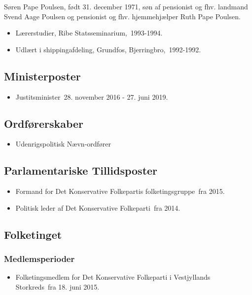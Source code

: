 \documentclass[11pt, a4paper]{awesome-cv}
\begin{document}
\makecvheader[R]
\makelettertitle
\begin{cvletter}
Søren Pape Poulsen, født 31. december 1971, søn af pensionist og fhv. landmand Svend Aage Poulsen og pensionist og fhv. hjemmehjælper Ruth Pape Poulsen.

\begin{itemize}
\item Lærerstudier, Ribe Statsseminarium, 1993-1994.
\item Udlært i shippingafdeling, Grundfos, Bjerringbro, 1992-1992.
\end{itemize}
\subsection*{Ministerposter}
\begin{itemize}
\item Justitsminister 28. november 2016 - 27. juni 2019.
\end{itemize}
\subsection*{Ordførerskaber}
\begin{itemize}
\item Udenrigspolitisk Nævn-ordfører
\end{itemize}
\subsection*{Parlamentariske Tillidsposter}
\begin{itemize}
\item Formand for Det Konservative Folkepartis folketingsgruppe fra 2015.
\item Politisk leder af Det Konservative Folkeparti fra 2014.
\end{itemize}
\subsection*{Folketinget}
\subsubsection*{Medlemsperioder}
\begin{itemize}
\item Folketingsmedlem for Det Konservative Folkeparti i Vestjyllands Storkreds fra 18. juni 2015.
\end{itemize}

\end{cvletter}
\end{document}
